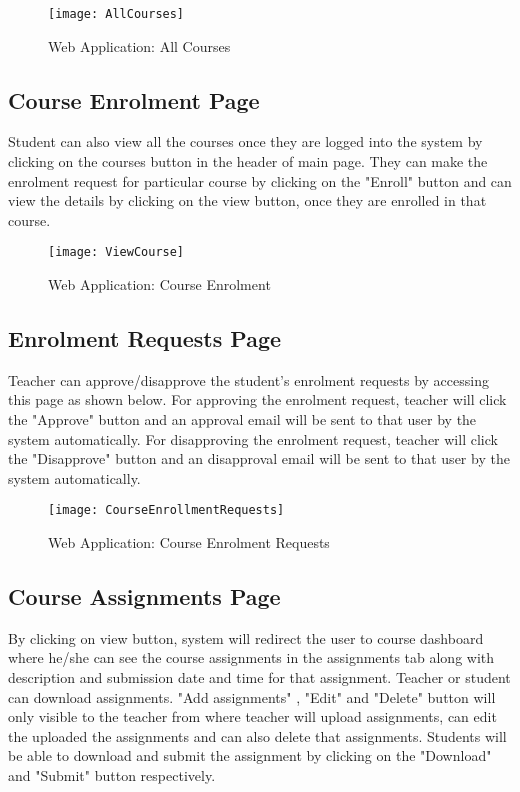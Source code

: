\begin{figure}[h]
  \centering
  \texttt{[image: AllCourses]}
  \caption{Web Application: All Courses}
\end{figure}

\subsection{Course Enrolment Page}
Student can also view all the courses once they are logged into the system by clicking on the courses button in the header of main page. They can make the enrolment request for particular course by clicking on the "Enroll" button and can view the details by clicking on the view button, once they are enrolled in that course.

\begin{figure}[h]
  \centering
  \texttt{[image: ViewCourse]}
  \caption{Web Application: Course Enrolment}
\end{figure}

\subsection{Enrolment Requests Page}
Teacher can approve/disapprove the student's enrolment requests by accessing this page as shown below.  For approving the enrolment request, teacher will click the "Approve" button and an approval email will be sent to that user by the system automatically. For disapproving the enrolment request, teacher will click the "Disapprove" button and an disapproval email will be sent to that user by the system automatically.

\begin{figure}[h]
  \centering
  \texttt{[image: CourseEnrollmentRequests]}
  \caption{Web Application: Course Enrolment Requests}
\end{figure}

\subsection{Course Assignments Page}
By clicking on view button, system will redirect the user to course dashboard where he/she can see the course assignments in the assignments tab along with description and submission date and time for that assignment.  Teacher or student can download assignments. "Add assignments" , "Edit" and "Delete" button will only visible to the teacher from where teacher will upload assignments, can edit the uploaded the assignments and can also delete that assignments. Students will be able to download and submit the assignment by clicking on the "Download" and "Submit" button respectively. 

